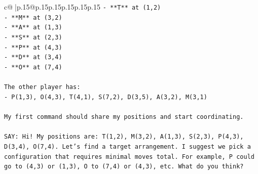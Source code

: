 \documentclass{article}
\begin{document}
{\begin{supertabular}{c@{$\;$}|p{.15\linewidth}@{}p{.15\linewidth}p{.15\linewidth}p{.15\linewidth}p{.15\linewidth}p{.15\linewidth}}
{{{\texttt{{-} **T** at (1,2)} \\
\texttt{{-} **M** at (3,2)} \\
\texttt{{-} **A** at (1,3)} \\
\texttt{{-} **S** at (2,3)} \\
\texttt{{-} **P** at (4,3)} \\
\texttt{{-} **D** at (3,4)} \\
\texttt{{-} **O** at (7,4)} \\
\\ 
\texttt{The other player has:} \\
\texttt{{-} P(1,3), O(4,3), T(4,1), S(7,2), D(3,5), A(3,2), M(3,1)} \\
\\ 
\texttt{My first command should share my positions and start coordinating.} \\
\\ 
\texttt{SAY: Hi! My positions are: T(1,2), M(3,2), A(1,3), S(2,3), P(4,3), D(3,4), O(7,4). Let's find a target arrangement. I suggest we pick a configuration that requires minimal moves total. For example, P could go to (4,3) or (1,3), O to (7,4) or (4,3), etc. What do you think?} \\
            }
        }
    }
     \\ \\


\end{supertabular}}
\end{document}
